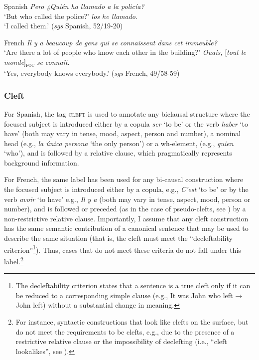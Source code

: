 \ea \label{ex:3:3} Spanish
\ea \textit{Pero ¿Quién ha llamado a la policía?}\\
 ‘But who called the police?'
 \normalsize \textit{los he llamado}.\\
‘I called them.' \hfill (\textit{sgs} Spanish, 52/19-20)  
\z
\z

\ea \label{ex:3:4} French
\ea  \textit{Il y a beaucoup de gens qui se connaissent dans cet immeuble?} \\
 ‘Are there a lot of people who know each other in the building?'
\ex \textit{Ouais,} [\textit{tout le monde}]\textsubscript{\textsc{foc}} \normalsize \textit{se connaît}.\\
‘Yes, everybody knows everybody.' \hfill (\textit{sgs} French, 49/58-59)   
\z \z 

\subsubsection{Cleft}
For Spanish, the tag \textsc{cleft} is used to annotate any biclausal structure where the focused subject is introduced either by a copula \textit{ser} `to be' or the verb \textit{haber} `to have' (both may vary in tense, mood, aspect, person and number), a nominal head (e.g., \textit{la única persona} `the only person') or a wh-element, (e.g., \textit{quien} `who'), and is followed by a relative clause, which pragmatically represents background information.

For French, the same label has been used for any bi-causal construction where the focused subject is introduced either by a copula, e.g., \textit{C'est} `to be' or by the verb \textit{avoir} `to have'  e.g., \textit{Il y a} (both may vary in tense, aspect, mood, person or number), and is followed or preceded (as in the case of pseudo-clefts, see ) by a non-restrictive relative clause.
Importantly, I assume that any cleft construction has the same semantic contribution of a canonical sentence that may be used to describe the same situation (that is, the cleft must meet the ``decleftability criterion''\footnote{The decleftability criterion states that a sentence is a true cleft only if it can be reduced to a corresponding simple clause (e.g., It was John who left → John left) without a substantial change in meaning.}). Thus, cases that do not meet these criteria do not fall under this label.\footnote{For instance, syntactic constructions that look like clefts on the surface, but do not meet the requirements to be clefts, e.g., due to the presence of a restrictive relative clause or the impossibility of declefting (i.e., ``cleft lookalikes”, see \cite{karssenberg2017oiseaux}).}

